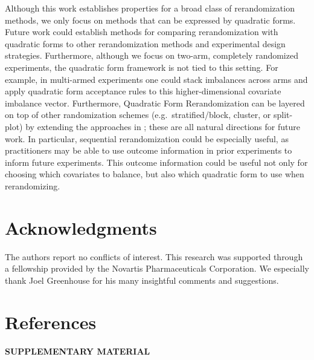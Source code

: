 \documentclass[11pt,twoside]{article}
\theoremstyle{definition}
\theoremstyle{remark}
\begin{document}
Although this work establishes properties for a broad class of rerandomization methods, we only focus on methods that can be expressed by quadratic forms. Future work could establish methods for comparing rerandomization with quadratic forms to other rerandomization methods and experimental design strategies. Furthermore, although we focus on two-arm, completely randomized experiments, the quadratic form framework is not tied to this setting. For example, in multi-armed experiments one could stack imbalances across arms and apply quadratic form acceptance rules to this higher-dimensional covariate imbalance vector. Furthermore, Quadratic Form Rerandomization can be layered on top of other randomization schemes (e.g.\ stratified/block, cluster, or split-plot) by extending the approaches in \cite{wang2023rerandomization, lu2023design, shi2022rerandomization}; these are all natural directions for future work. In particular, sequential rerandomization could be especially useful, as practitioners may be able to use outcome information in prior experiments to inform future experiments. This outcome information could be useful not only for choosing which covariates to balance, but also which quadratic form to use when rerandomizing.


\section*{Acknowledgments}
The authors report no conflicts of interest. This research was supported through a fellowship provided by the Novartis Pharmaceuticals Corporation. We especially thank Joel Greenhouse for his many insightful comments and suggestions.



\section*{References}
\vspace{-1cm}




\setlength{\parindent}{0cm}
\appendix

\begin{center}
{\large\bf SUPPLEMENTARY MATERIAL}
\end{center}
\end{document}
